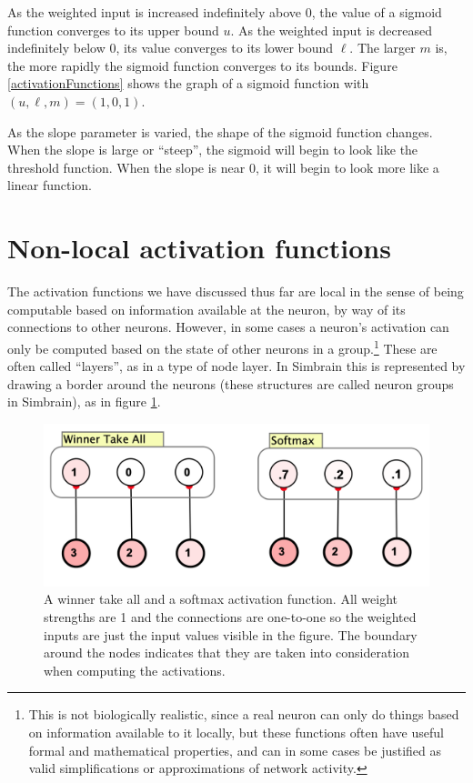    As the weighted input is increased indefinitely above $0$, the value of a 
sigmoid function converges to its upper bound $u$. As the weighted input is 
decreased indefinitely below $0$, its value converges to its lower bound $\ell$.
The larger $m$ is, the more rapidly the sigmoid function converges to its 
bounds. Figure \ref{activationFunctions} shows the graph of a sigmoid function with 
$(u,\ell,m) = (1,0,1)$. 

As the slope parameter is varied, the shape of the sigmoid function changes. When the slope is
large or ``steep'', the sigmoid will begin to look like the threshold function. When the slope is near $0$, it will begin to look more like a linear function.

\section{Non-local activation functions}\label{wta_softmax_section}

The activation functions we have discussed thus far are local in the sense of being computable based on information available at the neuron, by way of its connections to other neurons. However, in some cases a neuron's activation can only be computed based on the state of other neurons in a group.\footnote{This is not biologically realistic, since a real neuron can only do things based on information available to it locally, but these functions often have useful formal and mathematical properties, and can in some cases be justified as valid simplifications or approximations of network activity.} These are often called ``layers'', as in a type of node layer. In Simbrain this is represented by drawing a border around the neurons (these structures are called neuron groups in Simbrain), as in figure \ref{wta_softmax}.

\begin{figure}[h]
\centering
\includegraphics[scale=.4]{./images/softmax_wta.png}
\caption[Jeff Yoshimi.]{A winner take all and a softmax activation function. All weight strengths are 1 and the connections are one-to-one so the weighted inputs are just the input values visible in the figure. The boundary around the nodes indicates that they are taken into consideration when computing the activations.}
\label{wta_softmax}
\end{figure}

